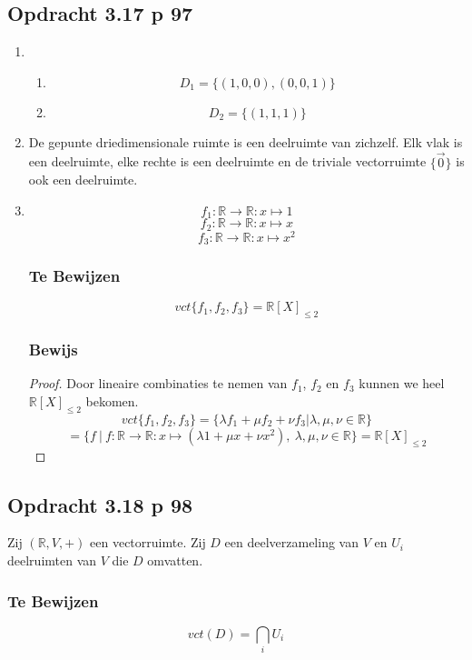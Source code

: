 \documentclass[lineaire_algebra_oplossingen.tex]{subfiles}
\begin{document}
\subsection{Opdracht 3.17 p 97}
\label{3.17}
\begin{enumerate}
\item
\begin{enumerate}
\item
\[
D_1 = \{(1,0,0),(0,0,1)\}
\]

\item
\[
D_2 = \{(1,1,1)\}
\]
\end{enumerate}

\item De gepunte driedimensionale ruimte is een deelruimte van zichzelf.
Elk vlak is een deelruimte, elke rechte is een deelruimte en de triviale vectorruimte $\{\vec{0}\}$ is ook een deelruimte.

\item
\[
f_1 : \mathbb{R} \rightarrow \mathbb{R} : x \mapsto 1
\]
\[
f_2 : \mathbb{R} \rightarrow \mathbb{R} : x \mapsto x
\]
\[
f_3 : \mathbb{R} \rightarrow \mathbb{R} : x \mapsto x^2
\]
\subsubsection*{Te Bewijzen}
\[
vct\{f_1,f_2,f_3\} = \mathbb{R}[X]_{\le 2}
\]
\subsubsection*{Bewijs}
\begin{proof}
Door lineaire combinaties te nemen van $f_1$, $f_2$ en $f_3$ kunnen we heel $\mathbb{R}[X]_{\le 2}$ bekomen.
\[
vct\{f_1,f_2,f_3\} = \{ \lambda f_1+ \mu f_2 + \nu f_3| \lambda,\mu,\nu \in \mathbb{R}\}
\]
\[ = \{f\ |\ f : \mathbb{R} \rightarrow \mathbb{R} : x \mapsto (\lambda 1+ \mu x + \nu x^2) ,\ \lambda,\mu,\nu \in \mathbb{R}\}= \mathbb{R}[X]_{\le 2}
\]
\end{proof}
\end{enumerate}

\subsection{Opdracht 3.18 p 98}
\label{3.18}
Zij $(\mathbb{R},V,+)$ een vectorruimte. Zij $D$ een deelverzameling van $V$ en $U_i$ deelruimten van $V$ die $D$ omvatten.

\subsubsection*{Te Bewijzen}
\[\displaystyle
vct(D) = \bigcap_{i}U_i
\]
\end{document}
